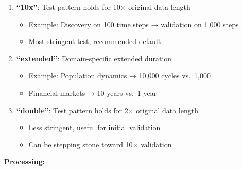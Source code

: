 \documentclass[
]{article}
\providecommand{\tightlist}{%
  \setlength{\itemsep}{0pt}\setlength{\parskip}{0pt}}
\begin{document}
\begin{enumerate}
\def\labelenumi{\arabic{enumi}.}
\tightlist
\item
  \textbf{``10x''}: Test pattern holds for 10× original data length

  \begin{itemize}
  \tightlist
  \item
    Example: Discovery on 100 time steps → validation on 1,000 steps
  \item
    Most stringent test, recommended default
  \end{itemize}
\item
  \textbf{``extended''}: Domain-specific extended duration

  \begin{itemize}
  \tightlist
  \item
    Example: Population dynamics → 10,000 cycles vs.~1,000
  \item
    Financial markets → 10 years vs.~1 year
  \end{itemize}
\item
  \textbf{``double''}: Test pattern holds for 2× original data length

  \begin{itemize}
  \tightlist
  \item
    Less stringent, useful for initial validation
  \item
    Can be stepping stone toward 10× validation
  \end{itemize}
\end{enumerate}

\textbf{Processing:}
\end{document}

